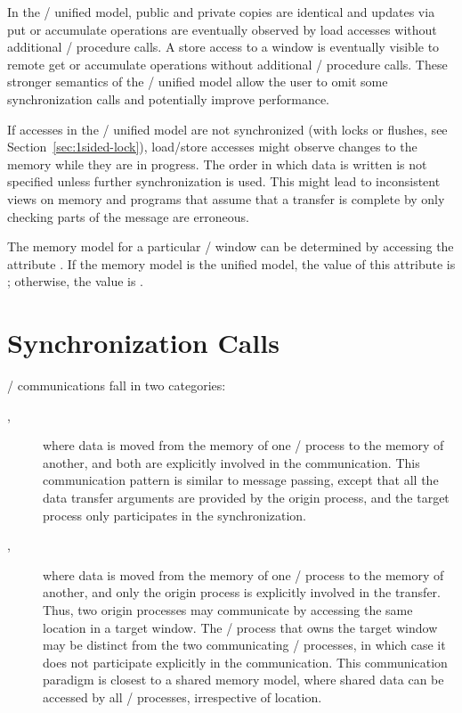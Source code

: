 In the \RMA/ unified model, public and private copies are identical and
updates via put or accumulate operations are eventually observed by load accesses
without additional \RMA/ procedure calls. A store access to a window is eventually
visible to remote get or accumulate operations without additional \RMA/
procedure calls. These stronger semantics of the \RMA/ unified model allow the
user to omit some synchronization calls and potentially improve
performance.

\begin{users}
If accesses in the \RMA/ unified model are not synchronized (with locks or
flushes, see Section~\ref{sec:1sided-lock}), load/store accesses
might observe changes to the memory while they are in progress. The
order in which data is written is not specified unless further
synchronization is used.  This might lead to inconsistent views on
memory and programs that assume that a transfer is complete by only
checking parts of the message are erroneous.
\end{users}

The memory model for a particular \RMA/ window can be determined by
accessing the attribute .  If the memory model
is the unified model, the value of this attribute is
; otherwise, the value is
.

\section{Synchronization Calls}
\label{sec:1sided-sync}

\RMA/ communications fall in two categories:
\begin{description}
\item[,] where data is moved from the memory of one
\mpi/ process to the memory of another, and both are explicitly involved in the
communication.  This communication pattern is similar to message
passing, except that all the data transfer arguments are provided by
the origin process, and the target process only participates in the synchronization.
\item[,] where data is moved from the memory of one
\mpi/ process to the memory of another, and only the origin process is
explicitly involved
in
the transfer.  Thus, two origin processes may communicate by accessing
the same location in a target window.  The \mpi/ process that owns the
target window may be distinct from the two communicating \mpi/ processes, 
in which case it does not participate explicitly in the communication.
This communication
paradigm is closest to a shared memory model, where shared data can be
accessed by all \mpi/ processes, irrespective 
of location.
\end{description}

